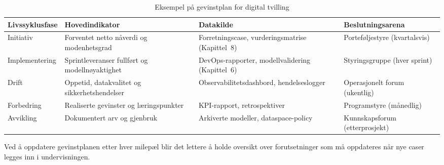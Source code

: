 \begin{table}[h]
    \centering
    \caption{Eksempel på gevinstplan for digital tvilling}
    \label{tab:gevinstplan}
    \begin{tabular}{p{2.8cm}p{3.8cm}p{3.5cm}p{3.2cm}}
        \toprule
        Livssyklusfase & Hovedindikator & Datakilde & Beslutningsarena \\
        \midrule
        Initiativ & Forventet netto nåverdi og modenhetsgrad & Forretningscase, vurderingsmatrise (Kapittel~8) & Porteføljestyre (kvartalsvis) \\
        Implementering & Sprintleveranser fullført og modellnøyaktighet & DevOps-rapporter, modellvalidering (Kapittel~6) & Styringsgruppe (hver sprint) \\
        Drift & Oppetid, datakvalitet og sikkerhetshendelser & Observabilitetsdashbord, hendelseslogger & Operasjonelt forum (ukentlig) \\
        Forbedring & Realiserte gevinster og læringspunkter & KPI-rapport, retrospektiver & Programstyre (månedlig) \\
        Avvikling & Dokumentert arv og gjenbruk & Arkiverte modeller, dataspace-policy & Kunnskapsforum (etterprosjekt) \\
        \bottomrule
    \end{tabular}
\end{table}

Ved å oppdatere gevinstplanen etter hver milepæl blir det lettere å holde oversikt over forutsetninger som må oppdateres når nye caser legges inn i undervisningen.

